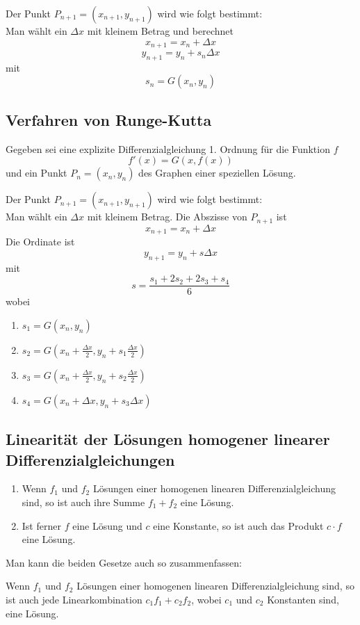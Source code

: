\documentclass[10pt,a4paper]{scrartcl}
\begin{document}
Der Punkt $P_{n+1} = (x_{n+1}, y_{n+1})$ wird wie folgt bestimmt:\\
Man wählt ein $\Delta{x}$ mit kleinem Betrag und berechnet
$$x_{n+1} = x_n + \Delta x$$
$$y_{n+1} = y_n + s_n\Delta x$$
mit
$$s_n = G(x_n,y_n)$$


\subsection{Verfahren von Runge-Kutta}

Gegeben sei eine explizite Differenzialgleichung 1. Ordnung für die Funktion $f$
$$f'(x) = G(x, f(x))$$
und ein Punkt $P_n = (x_n, y_n)$ des Graphen einer speziellen Lösung.

Der Punkt $P_{n+1} = (x_{n+1},y_{n+1})$ wird wie folgt bestimmt:\\
Man wählt ein $\Delta{x}$ mit kleinem Betrag. Die Abszisse von $P_{n+1}$ ist
$$x_{n+1} = x_n + \Delta x$$
Die Ordinate ist
$$y_{n+1} = y_n + s\Delta x$$
mit
$$s = \frac{s_1 + 2s_2 + 2s_3 + s_4}{6}$$
wobei
\begin{enumerate}
    \item $\displaystyle s_1 = G(x_n, y_n)$
    \item $\displaystyle s_2 = G\left(x_n + \frac{\Delta{x}}{2}, y_n + s_1
        \frac{\Delta x}{2}\right)$
    \item $\displaystyle s_3 = G\left(x_n + \frac{\Delta{x}}{2}, y_n + s_2
        \frac{\Delta x}{2}\right)$
    \item $\displaystyle s_4 = G(x_n+\Delta x, y_n+s_3\Delta x)$
\end{enumerate}


\subsection{Linearität der Lösungen homogener linearer Differenzialgleichungen}

\begin{enumerate}
    \item Wenn $f_1$ und $f_2$ Lösungen einer homogenen linearen
        Differenzialgleichung sind, so ist auch ihre Summe $f_1 + f_2$ eine
        Lösung.
    \item Ist ferner $f$ eine Lösung und $c$ eine Konstante, so ist auch das
        Produkt $c \cdot f$ eine Lösung.
\end{enumerate}

Man kann die beiden Gesetze auch so zusammenfassen:

Wenn $f_1$ und $f_2$ Lösungen einer homogenen linearen Differenzialgleichung
sind, so ist auch jede Linearkombination $c_1f_1 + c_2f_2$, wobei $c_1$ und
$c_2$ Konstanten sind, eine Lösung.
\end{document}
